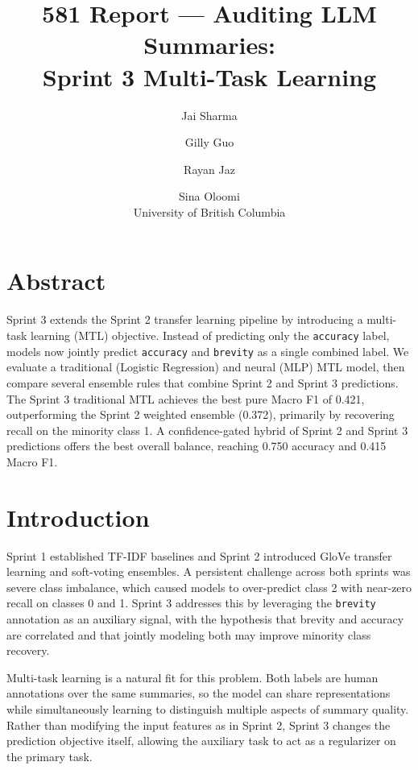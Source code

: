 \documentclass[11pt,twocolumn]{article}
\title{\textbf{581 Report --- Auditing LLM Summaries:\\Sprint 3 Multi-Task Learning}}
\author{Jai Sharma \and Gilly Guo \and Rayan Jaz \and Sina Oloomi\\[0.5em]
\small University of British Columbia}
\date{}
\begin{document}
\maketitle

\section{Abstract}

Sprint 3 extends the Sprint 2 transfer learning pipeline by introducing a
multi-task learning (MTL) objective. Instead of predicting only the
\texttt{accuracy} label, models now jointly predict \texttt{accuracy} and
\texttt{brevity} as a single combined label. We evaluate a traditional
(Logistic Regression) and neural (MLP) MTL model, then compare several
ensemble rules that combine Sprint 2 and Sprint 3 predictions. The Sprint 3
traditional MTL achieves the best pure Macro F1 of 0.421, outperforming the
Sprint 2 weighted ensemble (0.372), primarily by recovering recall on the
minority class 1. A confidence-gated hybrid of Sprint 2 and Sprint 3
predictions offers the best overall balance, reaching 0.750 accuracy and 0.415
Macro F1.

\section{Introduction}

Sprint 1 established TF-IDF baselines and Sprint 2 introduced GloVe transfer
learning and soft-voting ensembles. A persistent challenge across both sprints
was severe class imbalance, which caused models to over-predict class 2 with
near-zero recall on classes 0 and 1. Sprint 3 addresses this by leveraging the
\texttt{brevity} annotation as an auxiliary signal, with the hypothesis that
brevity and accuracy are correlated and that jointly modeling both may improve
minority class recovery.

Multi-task learning is a natural fit for this problem. Both labels are human
annotations over the same summaries, so the model can share representations
while simultaneously learning to distinguish multiple aspects of summary
quality. Rather than modifying the input features as in Sprint 2, Sprint 3
changes the prediction objective itself, allowing the auxiliary task to act as
a regularizer on the primary task.
\end{document}

